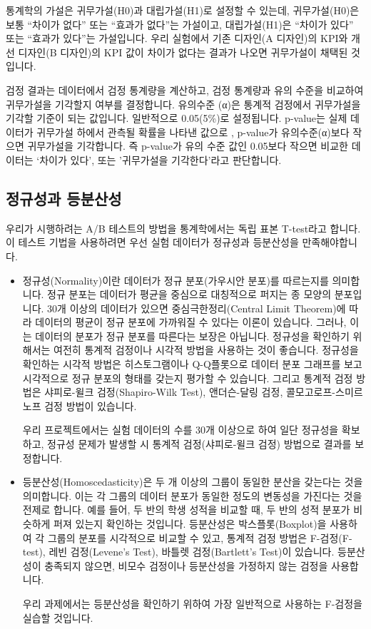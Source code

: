 \documentclass[
  letterpaper,
]{book}
\begin{document}
통계학의 가설은 귀무가설(H0)과 대립가설(H1)로 설정할 수 있는데,
귀무가설(H0)은 보통 ``차이가 없다'' 또는 ``효과가 없다''는 가설이고,
대립가설(H1)은 ``차이가 있다'' 또는 ``효과가 있다''는 가설입니다. 우리
실험에서 기존 디자인(A 디자인)의 KPI와 개선 디자인(B 디자인)의 KPI 값이
차이가 없다는 결과가 나오면 귀무가설이 채택된 것입니다.

검정 결과는 데이터에서 검정 통계량을 계산하고, 검정 통계량과 유의 수준을
비교하여 귀무가설을 기각할지 여부를 결정합니다. 유의수준 (α)은 통계적
검정에서 귀무가설을 기각할 기준이 되는 값입니다. 일반적으로 0.05(5\%)로
설정됩니다. p-value는 실제 데이터가 귀무가설 하에서 관측될 확률을 나타낸
값으로 , p-value가 유의수준(α)보다 작으면 귀무가설을 기각합니다. 즉
p-value가 유의 수준 값인 0.05보다 작으면 비교한 데이터는 `차이가 있다',
또는 '귀무가설을 기각한다'라고 판단합니다.

\subsection{정규성과
등분산성}\label{uxc815uxaddcuxc131uxacfc-uxb4f1uxbd84uxc0b0uxc131}

우리가 시행하려는 A/B 테스트의 방법을 통계학에서는 독립 표본 T-test라고
합니다. 이 테스트 기법을 사용하려면 우선 실험 데이터가 정규성과
등분산성을 만족해야합니다.

\begin{itemize}
\item
  정규성(Normality)이란 데이터가 정규 분포(가우시안 분포)를 따르는지를
  의미합니다. 정규 분포는 데이터가 평균을 중심으로 대칭적으로 퍼지는 종
  모양의 분포입니다. 30개 이상의 데이터가 있으면 중심극한정리(Central
  Limit Theorem)에 따라 데이터의 평균이 정규 분포에 가까워질 수 있다는
  이론이 있습니다. 그러나, 이는 데이터의 분포가 정규 분포를 따른다는
  보장은 아닙니다. 정규성을 확인하기 위해서는 여전히 통계적 검정이나
  시각적 방법을 사용하는 것이 좋습니다. 정규성을 확인하는 시각적 방법은
  히스토그램이나 Q-Q플롯으로 데이터 분포 그래프를 보고 시각적으로 정규
  분포의 형태를 갖는지 평가할 수 있습니다. 그리고 통계적 검정 방법은
  샤피로-윌크 검정(Shapiro-Wilk Test), 앤더슨-달링 검정,
  콜모고로프-스미르노프 검정 방법이 있습니다.

  우리 프로젝트에서는 실험 데이터의 수를 30개 이상으로 하여 일단
  정규성을 확보하고, 정규성 문제가 발생할 시 통계적 검정(샤피로-윌크
  검정) 방법으로 결과를 보정합니다.
\item
  등분산성(Homoscedasticity)은 두 개 이상의 그룹이 동일한 분산을
  갖는다는 것을 의미합니다. 이는 각 그룹의 데이터 분포가 동일한 정도의
  변동성을 가진다는 것을 전제로 합니다. 예를 들어, 두 반의 학생 성적을
  비교할 때, 두 반의 성적 분포가 비슷하게 퍼져 있는지 확인하는 것입니다.
  등분산성은 박스플롯(Boxplot)을 사용하여 각 그룹의 분포를 시각적으로
  비교할 수 있고, 통계적 검정 방법은 F-검정(F-test), 레빈 검정(Levene's
  Test), 바틀렛 검정(Bartlett's Test)이 있습니다. 등분산성이 충족되지
  않으면, 비모수 검정이나 등분산성을 가정하지 않는 검정을 사용합니다.

  우리 과제에서는 등분산성을 확인하기 위하여 가장 일반적으로 사용하는
  F-검정을 실습할 것입니다.
\end{itemize}
\end{document}
